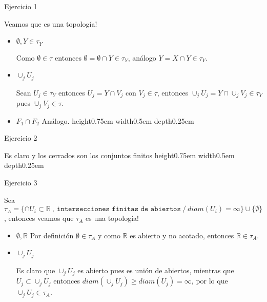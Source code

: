 \documentclass[11pt]{article}
\newcommand{\R}{{\mathbb{R}}}
\newcommand{\sett}[1]{\{#1\}}
\newenvironment{proof}[1][Demostraci\'on]{\begin{trivlist}
\item[\hskip \labelsep {\bfseries #1}]}{\end{trivlist}}
\newcommand{\qed}{\nobreak \ifvmode \relax \else
      \ifdim\lastskip<1.5em \hskip-\lastskip
      \hskip1.5em plus0em minus0.5em \fi \nobreak
      \vrule height0.75em width0.5em depth0.25em\fi}
\begin{document}
\bigskip

\begin{enumerate}

\item{Ejercicio 1}

\begin{proof}

Veamos que es una topolog\'ia!

\begin{itemize}

\item {$\emptyset,Y \in \tau_Y$}

Como $\emptyset \in \tau$ entonces $\emptyset = \emptyset \cap Y \in \tau_Y$, an\'alogo $Y = X \cap Y \in \tau_Y$.

\item {$\cup_{j}{U_j}$}

Sean $U_j \in \tau_Y$ entonces $U_j = Y \cap V_j$ con $V_j \in \tau$, entonces $\cup_{j}{U_j} = Y \cap \cup_{j}{V_j} \in \tau_Y$ pues $\cup_{j}{V_j} \in \tau$.

\item{$F_1 \cap F_2$}
An\'alogo. \qed
\end{itemize}

\end{proof}

\item {Ejercicio 2}

\begin{proof}

Es claro y los cerrados son los conjuntos finitos \qed

\end{proof}

\item{Ejercicio 3}

\begin{proof}
Sea $\tau_A = \sett{\cap U_i \subset \R \ , \ \texttt{intersecciones finitas de abiertos} \ / \ diam(U_i)=\infty} \cup \sett{\emptyset}$, entonces veamos que $\tau_A$ es una topolog\'ia!

\begin{itemize}
\item {$\emptyset,\R$}
Por definici\'on $\emptyset \in \tau_A$ y como $\R$ es abierto y no acotado, entonces $\R \in \tau_A$.

\item{$\cup_{j}{U_j}$}

Es claro que $\cup_{j}{U_j}$ es abierto pues es uni\'on de abiertos, mientras que $U_j \subset \cup_{j}{U_j}$ entonces $diam(\cup_{j}{U_j}) \geq diam(U_j) = \infty$, por lo que $\cup_{j}{U_j} \in \tau_A$.


\end{itemize}
\end{proof}
\end{enumerate}
\end{document}
